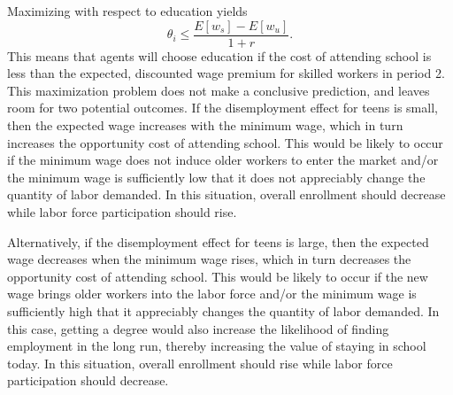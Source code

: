 \documentclass[12pt]{article}
\begin{document}
Maximizing with respect to education yields
\begin{equation}
\theta_i \le \frac{E[w_s] - E[w_u]}{1+r} .

\end{equation}
This means that agents will choose education if the cost of attending school is less than the expected, discounted wage premium for skilled workers in period 2. This maximization problem does not make a conclusive prediction, and leaves room for two potential outcomes. If the disemployment effect for teens is small, then the expected wage increases with the minimum wage, which in turn increases the opportunity cost of attending school. This would be likely to occur if the minimum wage does not induce older workers to enter the market and/or the minimum wage is sufficiently low that it does not appreciably change the quantity of labor demanded. In this situation, overall enrollment should decrease while labor force participation should rise.

Alternatively, if the disemployment effect for teens is large, then the expected wage decreases when the minimum wage rises, which in turn decreases the opportunity cost of attending school. This would be likely to occur if the new wage brings older workers into the labor force and/or the minimum wage is sufficiently high that it appreciably changes the quantity of labor demanded. In this case, getting a degree would also increase the likelihood of finding employment in the long run, thereby increasing the value of staying in school today. In this situation, overall enrollment should rise while labor force participation should decrease.
\end{document}
